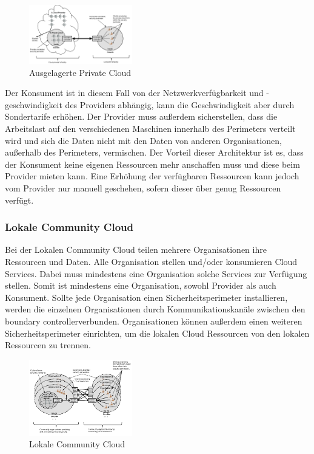 \begin{figure}[H]
    \centering
	\includegraphics[width=0.4\textwidth]{Images/OutSourcedPrivateCloud}
	\caption{Ausgelagerte Private Cloud \cite{Badger}}
	\label{OutSourcedPrivateCloud}
\end{figure}

Der Konsument ist in diesem Fall von der Netzwerkverfügbarkeit und -geschwindigkeit des Providers abhängig, kann die Geschwindigkeit aber durch Sondertarife erhöhen.
Der Provider muss außerdem sicherstellen, dass die Arbeitslast auf den verschiedenen Maschinen innerhalb des Perimeters verteilt wird und sich die Daten 
nicht mit den Daten von anderen Organisationen, außerhalb des Perimeters, vermischen.
Der Vorteil dieser Architektur ist es, dass der Konsument keine eigenen Ressourcen mehr anschaffen muss und diese beim Provider mieten kann.
Eine Erhöhung der verfügbaren Ressourcen kann jedoch vom Provider nur manuell geschehen, sofern dieser über genug Ressourcen verfügt. 



\subsubsection{Lokale Community Cloud}

Bei der Lokalen Community Cloud teilen mehrere Organisationen ihre Ressourcen und Daten. Alle Organisation stellen und/oder konsumieren Cloud Services.
Dabei muss mindestens eine Organisation solche Services zur Verfügung stellen. Somit ist mindestens eine Organisation, sowohl Provider als auch Konsument.
Sollte jede Organisation einen Sicherheitsperimeter installieren, werden die einzelnen Organisationen durch Kommunikationskanäle zwischen den \glqq boundary controller\grqq verbunden.
Organisationen können außerdem einen weiteren Sicherheitsperimeter einrichten, um die lokalen Cloud Ressourcen von den lokalen Ressourcen zu trennen.

\begin{figure}[H]
    \centering
	\includegraphics[width=0.4\textwidth]{Images/On-siteCommunityCloud}
	\caption{Lokale Community Cloud \cite{Badger}}
	\label{On-siteCommunityCloud}
\end{figure}

